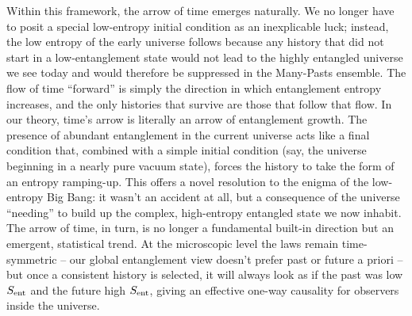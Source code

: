 \documentclass[11pt]{article}
\begin{document}
Within this framework, the arrow of time emerges naturally. We no longer have to posit a special low-entropy initial condition as an inexplicable luck; instead, the low entropy of the early universe follows because any history that did not start in a low-entanglement state would not lead to the highly entangled universe we see today and would therefore be suppressed in the Many-Pasts ensemble. The flow of time “forward” is simply the direction in which entanglement entropy increases, and the only histories that survive are those that follow that flow. In our theory, time’s arrow is literally an arrow of entanglement growth. The presence of abundant entanglement in the current universe acts like a final condition that, combined with a simple initial condition (say, the universe beginning in a nearly pure vacuum state), forces the history to take the form of an entropy ramping-up. This offers a novel resolution to the enigma of the low-entropy Big Bang: it wasn’t an accident at all, but a consequence of the universe “needing” to build up the complex, high-entropy entangled state we now inhabit. The arrow of time, in turn, is no longer a fundamental built-in direction but an emergent, statistical trend. At the microscopic level the laws remain time-symmetric – our global entanglement view doesn’t prefer past or future a priori – but once a consistent history is selected, it will always look as if the past was low $S_{\rm ent}$ and the future high $S_{\rm ent}$, giving an effective one-way causality for observers inside the universe.
\end{document}
